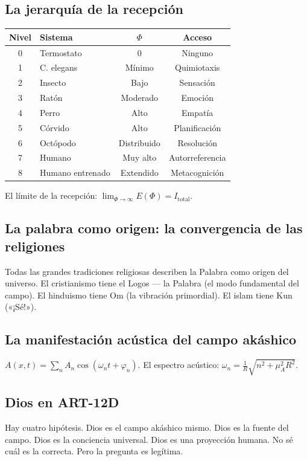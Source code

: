 \subsection{La jerarquía de la recepción}
\begin{table}[H]
\centering
\begin{tabular}{@{}clcc@{}}
\toprule
\textbf{Nivel} & \textbf{Sistema} & \textbf{$\Phi$} & \textbf{Acceso} \\ \midrule
0 & Termostato & 0 & Ninguno \\
1 & C. elegans & Mínimo & Quimiotaxis \\
2 & Insecto & Bajo & Sensación \\
3 & Ratón & Moderado & Emoción \\
4 & Perro & Alto & Empatía \\
5 & Córvido & Alto & Planificación \\
6 & Octópodo & Distribuido & Resolución \\
7 & Humano & Muy alto & Autorreferencia \\
8 & Humano entrenado & Extendido & Metacognición \\ \bottomrule
\end{tabular}
\end{table}
El límite de la recepción: $\lim_{\Phi \rightarrow \infty} E(\Phi) = I_{\text{total}}$.

\subsection{La palabra como origen: la convergencia de las religiones}
Todas las grandes tradiciones religiosas describen la Palabra como origen del universo. El cristianismo tiene el Logos --- la Palabra (el modo fundamental del campo). El hinduismo tiene Om (la vibración primordial). El islam tiene Kun («¡Sé!»).

\subsection{La manifestación acústica del campo akáshico}
$A(x,t) = \sum_n A_n \cos(\omega_n t + \varphi_n)$. El espectro acústico: $\omega_n = \frac{1}{R} \sqrt{n^2 + \mu_A^2 R^2}$.

\subsection{Dios en ART-12D}
Hay cuatro hipótesis. Dios es el campo akáshico mismo. Dios es la fuente del campo. Dios es la conciencia universal. Dios es una proyección humana. No sé cuál es la correcta. Pero la pregunta es legítima.

